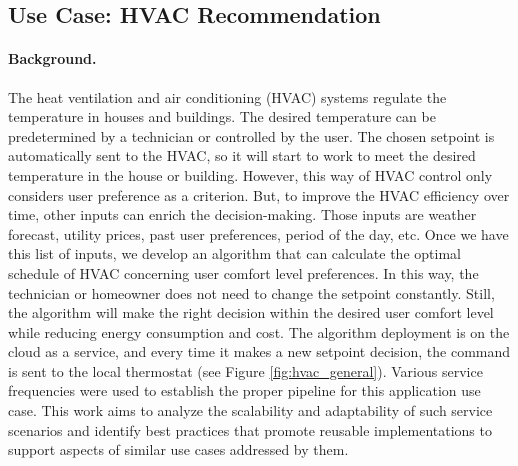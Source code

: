 \subsection{Use Case: HVAC Recommendation}
\paragraph*{Background.}
The heat ventilation and air conditioning (HVAC) systems regulate the temperature in houses and buildings. The desired temperature can be predetermined by a technician or controlled by the user. The chosen setpoint is automatically sent to the HVAC, so it will start to work to meet the desired temperature in the house or building. However, this way of HVAC control only considers user preference as a criterion. But, to improve the HVAC efficiency over time, other inputs can enrich the decision-making. Those inputs are weather forecast, utility prices, past user preferences, period of the day, etc. Once we have this list of inputs, we develop an algorithm that can calculate the optimal schedule of HVAC concerning user comfort level preferences. In this way, the technician or homeowner does not need to change the setpoint constantly. Still, the algorithm will make the right decision within the desired user comfort level while reducing energy consumption and cost. The algorithm deployment is on the cloud as a service, and every time it makes a new setpoint decision, the command is sent to the local thermostat (see Figure \ref{fig:hvac_general}). Various service frequencies were used to establish the proper pipeline for this application use case. This work aims to analyze the scalability and adaptability of such service scenarios and identify best practices that promote reusable implementations to support aspects of similar use cases addressed by them.

